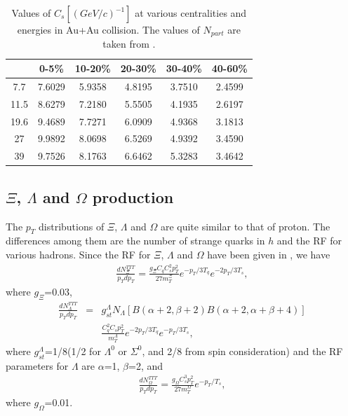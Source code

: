 \documentclass[twocolumn,aps,superscriptaddress,showpacs,nofootinbib,floatfix]{revtex4}
\begin{document}
\begin{table}[htbp]
	\centering
			\begin{tabular}{cccccc}
				\hline
				\hline
					\diagbox[width=12em]{$\sqrt{s}$(GeV)}{centrality}  &  0-5\%&10-20\%&20-30\%&30-40\%&40-60\%\\
				\hline
				7.7  &  7.6029  &  5.9358  &  4.8195  &  3.7510 &   2.4599\\
				11.5 &  8.6279  &  7.2180  &  5.5505  &  4.1935 &   2.6197\\
				19.6	&  9.4689  &  7.7271  &  6.0909  &  4.9368 &   3.1813\\
				27  &  9.9892  &  8.0698  &  6.5269  &  4.9392 &   3.4590\\
				39   &  9.7526  &  8.1763  &  6.6462  &  5.3283 &   3.4642\\
				\hline
				\hline	
			\end{tabular}
	\caption{Values of $C_s[(GeV/c)^{-1}]$  at various centralities and energies in Au+Au collision. The values of $N_{part}$ are taken from \cite{STAR:2017sal}.} 
	\label{tab4}
\end{table}
\subsection{$\Xi$, $\Lambda$ and $\Omega$ production}
The $p_T$ distributions of $\Xi$, $\Lambda$ and $\Omega$ are quite similar to that of proton. The differences among them are the number of strange quarks in $h$ and the RF for various hadrons. Since the RF for $\Xi$, $\Lambda$ and $\Omega$ have been given in \cite{2u,Hwa:2006vb,Hwa:2011bw}, we have
\begin{eqnarray}
	\frac{dN_{\Xi}^{TTT}}{p_Tdp_T}=\frac{g_{\Xi}C_qC_s^2p_T^2}{27m_T^{\Xi}}e^{-p_T/3T_q}e^{-2p_T/3T_s}, \label{4.8}
\end{eqnarray}
where $g_{\Xi}$=0.03,
\begin{eqnarray}
\frac{dN_{\Lambda}^{TTT}}{p_Tdp_T}&=&g_{st}^{\Lambda}N_{\Lambda}[B(\alpha+2,\beta+2)B(\alpha+2,\alpha+\beta+4)]\nonumber\\
&&\frac{C_q^2C_sp_T^2}{m_T^{\Lambda}}e^{-2p_T/3T_q}e^{-p_T/3T_s}, 
\label{4.9}
\end{eqnarray}
where $g_{st}^{\Lambda}$=1/8(1/2 for $\Lambda^0$ or $\Sigma^0$, and 2/8 from spin consideration) and the RF parameters for $\Lambda$ are $\alpha$=1, $\beta$=2, and
\begin{eqnarray}
		\frac{dN_{\Omega}^{TTT}}{p_Tdp_T}=\frac{g_{\Omega}C_s^3p_T^2}{27m_T^{\Omega}}e^{-p_T/T_s}, \label{4.10}
\end{eqnarray}
where $g_{\Omega}$=0.01. 
\end{document}
